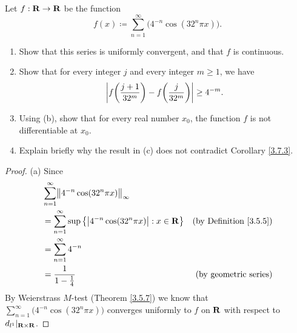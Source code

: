 \begin{exercise}\label{ex 4.7.10}
    Let \(f : \mathbf{R} \to \mathbf{R}\) be the function
    \[
        f(x) \coloneqq \sum_{n = 1}^\infty \big(4^{-n} \cos(32^n \pi x)\big).
    \]
    \begin{enumerate}
        \item Show that this series is uniformly convergent, and that \(f\) is continuous.
        \item Show that for every integer \(j\) and every integer \(m \geq 1\), we have
              \[
                  \left\lvert f\bigg(\frac{j + 1}{32^m}\bigg) - f\bigg(\frac{j}{32^m}\bigg)\right\rvert \geq 4^{-m}.
              \]
        \item Using (b), show that for every real number \(x_0\), the function \(f\) is not differentiable at \(x_0\).
        \item Explain briefly why the result in (c) does not contradict Corollary \ref{3.7.3}.
    \end{enumerate}
\end{exercise}

\begin{proof}{(a)}
    Since
    \begin{align*}
         & \sum_{n = 1}^\infty \norm*{4^{-n} \cos(32^n \pi x)}_{\infty}                                                        \\
         & = \sum_{n = 1}^\infty \sup\big\{\abs{4^{-n} \cos(32^n \pi x)} : x \in \R\big\} & \text{(by Definition \ref{3.5.5})} \\
         & = \sum_{n = 1}^\infty 4^{-n}                                                                                        \\
         & = \frac{1}{1 - \frac{1}{4}}                                                    & \text{(by geometric series)}
    \end{align*}
    By Weierstrass \(M\)-test (Theorem \ref{3.5.7}) we know that \(\sum_{n = 1}^\infty \big(4^{-n} \cos(32^n \pi x)\big)\) converges uniformly to \(f\) on \(\mathbf{R}\) with respect to \(d_{l^1}|_{\mathbf{R} \times \mathbf{R}}\).
\end{proof}

